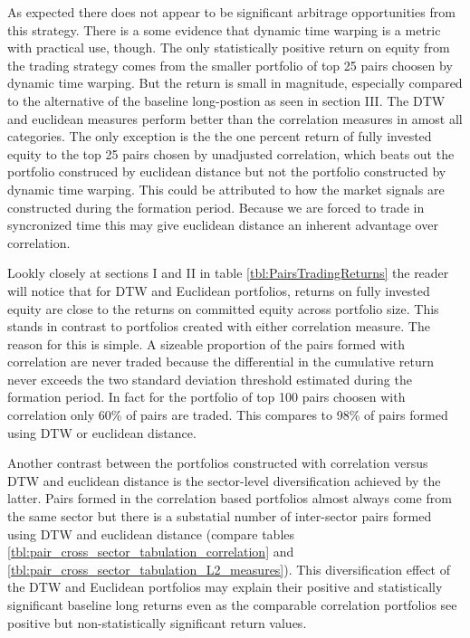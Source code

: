 \documentclass[12pt]{article}
\begin{document}
As expected there does not appear to be significant arbitrage opportunities from this strategy. There is a some evidence that dynamic time warping is a metric with practical use, though. The only statistically positive return on equity from the trading strategy comes from the smaller portfolio of top 25 pairs choosen by dynamic time warping. But the return is small in magnitude, especially compared to the alternative of the baseline long-postion as seen in section III. The DTW and euclidean measures perform better than the correlation measures in amost all categories. The only exception is the the one percent return of fully invested equity to the top 25 pairs chosen by unadjusted correlation, which beats out the portfolio construced by euclidean distance but not the portfolio constructed by dynamic time warping. This could be attributed to how the market signals are constructed during the formation period. Because we are forced to trade in syncronized time this may give euclidean distance an inherent advantage over correlation.

Lookly closely at sections I and II in table \ref{tbl:PairsTradingReturns} the reader will notice that for DTW and Euclidean portfolios, returns on fully invested equity are close to the returns on committed equity across portfolio size. This stands in contrast to portfolios created with either correlation measure. The reason for this is simple. A sizeable proportion of the pairs formed with correlation are never traded because the differential in the cumulative return never exceeds the two standard deviation threshold estimated during the formation period. In fact for the portfolio of top 100 pairs choosen with correlation only 60\% of pairs are traded. This compares to 98\% of pairs formed using DTW or euclidean distance.

Another contrast between the portfolios constructed with correlation versus DTW and euclidean distance is the sector-level diversification achieved by the latter. Pairs formed in the correlation based portfolios almost always come from the same sector but there is a substatial number of inter-sector pairs formed using DTW and euclidean distance (compare tables  \ref{tbl:pair_cross_sector_tabulation_correlation} and \ref{tbl:pair_cross_sector_tabulation_L2_measures}). This diversification effect of the DTW and Euclidean portfolios may explain their positive and statistically significant baseline long returns even as the comparable correlation portfolios see positive but non-statistically significant return values. 
\end{document}
